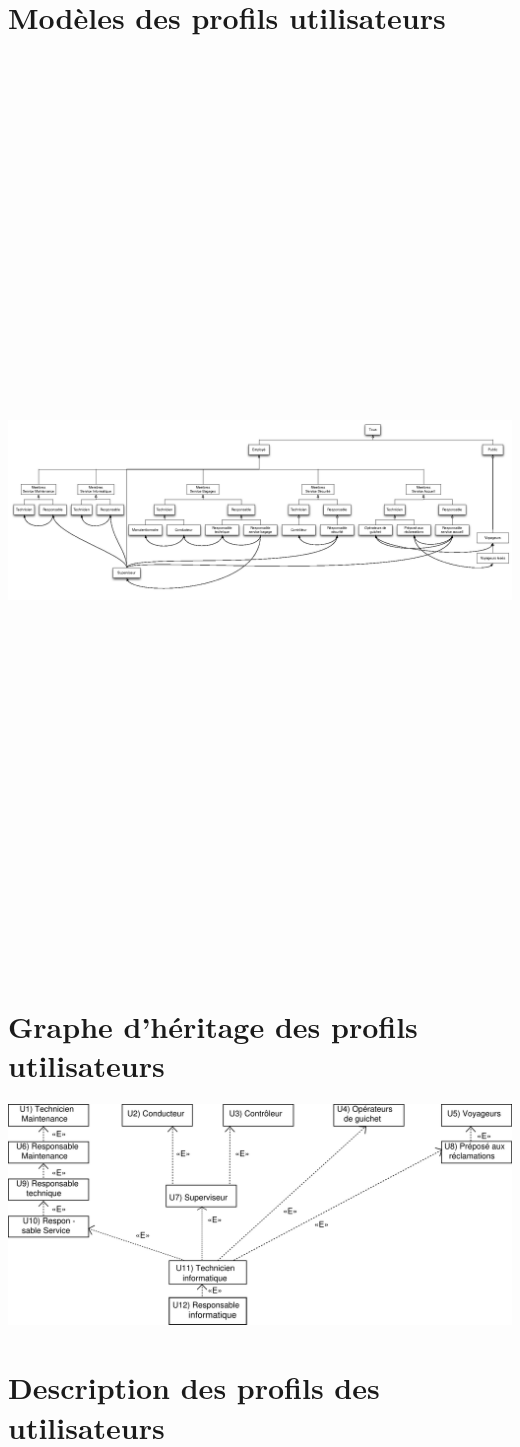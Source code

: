 \part{Modèles des profils utilisateurs}
\begin{center}
    \includegraphics[angle=90, height=24cm]{../../MU/src/img/MU.png}
\end{center}
\newpage
\part{Graphe d'héritage des profils utilisateurs}
\includegraphics[width=\linewidth]{../../GPU/src/img/GPU.png}
\newpage

\part{Description des profils des utilisateurs}

\newpage

